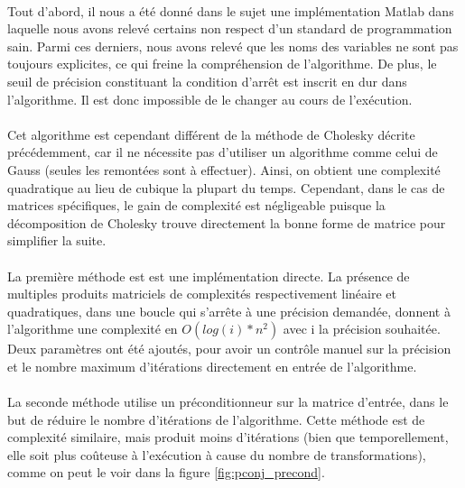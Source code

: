 \documentclass{article}
\begin{document}
\paragraph{}
    Tout d'abord, il nous a été donné dans le sujet une implémentation Matlab dans laquelle nous avons relevé certains non respect d'un standard de programmation sain. Parmi ces derniers, nous avons relevé que les noms des variables ne sont pas toujours explicites, ce qui freine la compréhension de l'algorithme. De plus, le seuil de précision constituant la condition d'arrêt est inscrit en dur dans l'algorithme. Il est donc impossible de le changer au cours de l'exécution.
    
\paragraph{}
    Cet algorithme est cependant différent de la méthode de Cholesky décrite précédemment, car il ne nécessite pas d'utiliser un algorithme comme celui de Gauss (seules les remontées sont à effectuer). Ainsi, on obtient une complexité quadratique au lieu de cubique la plupart du temps. Cependant, dans le cas de matrices spécifiques, le gain de complexité est négligeable puisque la décomposition de Cholesky trouve directement la bonne forme de matrice pour simplifier la suite.

\paragraph{}
    La première méthode est est une implémentation directe. La présence de multiples produits matriciels de complexités respectivement linéaire et quadratiques, dans une boucle qui s'arrête à une précision demandée, donnent à l'algorithme une complexité en $O(log(i)*n^2)$ avec i la précision souhaitée. Deux paramètres ont été ajoutés, pour avoir un contrôle manuel sur la précision et le nombre maximum d'itérations directement en entrée de l'algorithme. 
    
\paragraph{}
    La seconde méthode utilise un préconditionneur sur la matrice d'entrée, dans le but de réduire le nombre d'itérations de l'algorithme. Cette méthode est de complexité similaire, mais produit moins d'itérations (bien que temporellement, elle soit plus coûteuse à l'exécution à cause du nombre de transformations), comme on peut le voir dans la figure \ref{fig:pconj_precond}. 
    
\end{document}
